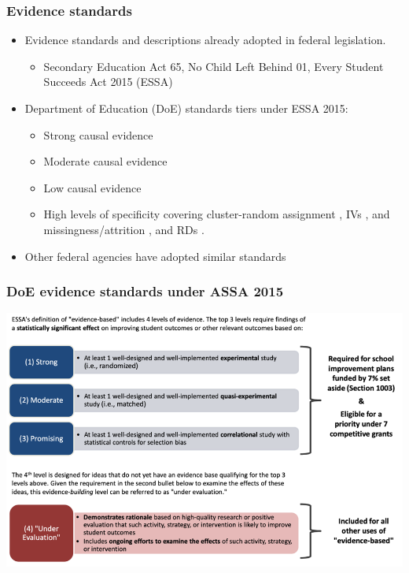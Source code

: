 \documentclass[usenames,dvipsnames]{beamer}
\begin{document}

\begin{frame}
\frametitle{Evidence standards}

\begin{itemize}
\item Evidence standards and descriptions already adopted in federal legislation.
\begin{itemize}
\item Secondary Education Act 65, No Child Left Behind 01, Every Student Succeeds Act 2015 (ESSA)
\end{itemize}
\pause
\vspace{0.5cm}
\item Department of Education (DoE) standards tiers under ESSA 2015:
\begin{itemize}
\item Strong causal evidence
\item Moderate causal evidence
\item Low causal evidence
\item High levels of specificity covering cluster-random assignment \hyperlink{doe_cluster}{}, IVs \hyperlink{doe_iv}{}, and missingness/attrition \hyperlink{doe_missing}{}, and RDs \hyperlink{doe_rd}{}. 
\end{itemize}
\pause
\item Other federal agencies have adopted similar standards \hyperlink{other_agencies}{}        
\end{itemize}

\end{frame}


\begin{frame}
\frametitle{DoE evidence standards under ASSA 2015}

\begin{center}
\vspace{-0.85cm}
\hspace*{-1cm}
\includegraphics[scale=0.75]{../figs/doe_tiers.png}
\end{center}

\end{frame}
\end{document}
